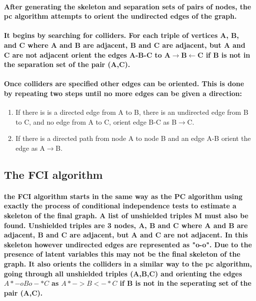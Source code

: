 \documentclass{article}
\begin{document}
\paragraph{After generating the skeleton and separation sets of pairs of nodes, the pc algorithm attempts to orient the undirected edges of the graph.}
\paragraph{It begins by searching for colliders. For each triple of vertices A, B, and C where A and B are adjacent, B and C are adjacent, but A and C are not adjacent orient the edges A-B-C to A$\rightarrow$B$\leftarrow$C if B is not in the separation set of the pair (A,C).}

\paragraph{Once colliders are specified other edges can be oriented. This is done by repeating two steps until no more edges can be given a direction:
}
\begin{enumerate}[i]
  \item If there is is a directed edge from A to B, there is an undirected edge from B to C, and no edge from A to C, orient edge B-C as B$\rightarrow$C.
  \item If there is a directed path from node A to node B and an edge A-B orient the edge as A$\rightarrow$B\cite{spirtes1991algorithm}. 
\end{enumerate}


\subsection{The FCI algorithm}

\paragraph{the FCI algorithm starts in the same way as the PC algorithm using exactly the process of conditional independence tests to estimate a skeleton of the final graph. A list of unshielded triples M must also be found. Unshielded triples are 3 nodes, A, B and C where A and B are adjacent, B and C are adjacent, but A and C are not adjacent. In this skeleton however undirected edges are represented as "o-o". Due to the presence of latent variables this may not be the final skeleton of the graph. It also orients the colliders in a similar way to the pc algorithm, going through all unshielded triples (A,B,C) and orienting the edges $A*-oBo-*C$ as $A*->B<-*C$ if B is not in the seperating set of the pair (A,C).}
\end{document}
